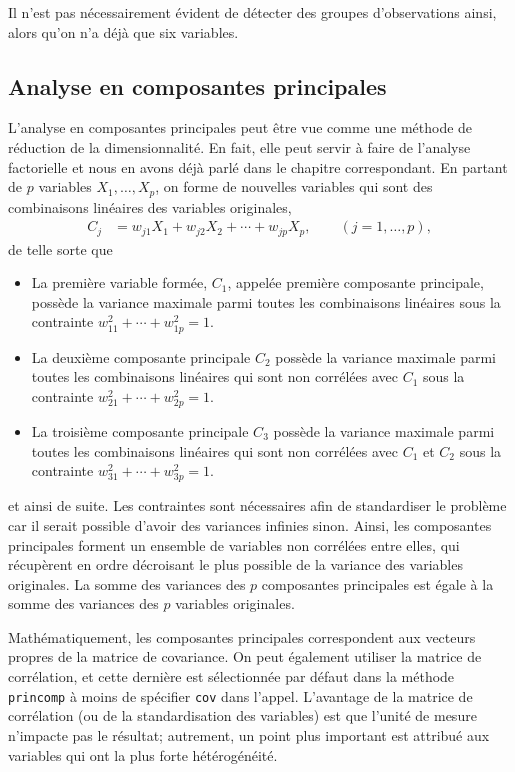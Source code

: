 \documentclass[
  11pt,
  letterpaper,
]{book}
\providecommand{\tightlist}{%
  \setlength{\itemsep}{0pt}\setlength{\parskip}{0pt}}
\theoremstyle{definition}
\theoremstyle{definition}
\theoremstyle{definition}
\theoremstyle{definition}
\theoremstyle{remark}
\begin{document}
Il n'est pas nécessairement évident de détecter des groupes d'observations ainsi, alors qu'on n'a déjà que six variables.

\hypertarget{analyse-en-composantes-principales}{%
\subsection{Analyse en composantes principales}\label{analyse-en-composantes-principales}}

L'analyse en composantes principales peut être vue comme une méthode de réduction de la dimensionnalité. En fait, elle peut servir à faire de l'analyse factorielle et nous en avons déjà parlé dans le chapitre correspondant. En partant de \(p\) variables \(X_1, \ldots, X_p\), on forme de nouvelles variables qui sont des combinaisons linéaires des variables originales,
\begin{align*}
C_j &= w_{j1} X_1 + w_{j2} X_2 + \cdots + w_{jp} X_p, \qquad (j=1, \ldots, p),
\end{align*}
de telle sorte que

\begin{itemize}
\tightlist
\item
  La première variable formée, \(C_1\), appelée première composante principale, possède la variance maximale parmi toutes les combinaisons linéaires sous la contrainte \(w_{11}^2 + \cdots + w_{1p}^2=1\).
\item
  La deuxième composante principale \(C_2\) possède la variance maximale parmi toutes les combinaisons linéaires qui sont non corrélées avec \(C_1\) sous la contrainte \(w_{21}^2 + \cdots + w_{2p}^2=1\).
\item
  La troisième composante principale \(C_3\) possède la variance maximale parmi toutes les combinaisons linéaires qui sont non corrélées avec \(C_1\) et \(C_2\) sous la contrainte \(w_{31}^2 + \cdots + w_{3p}^2=1\).
\end{itemize}

et ainsi de suite. Les contraintes sont nécessaires afin de standardiser le problème car il serait possible d'avoir des variances infinies sinon. Ainsi, les composantes principales forment un ensemble de variables non corrélées entre elles, qui récupèrent en ordre décroisant le plus possible de la variance des variables originales. La somme des variances des \(p\) composantes principales est égale à la somme des variances des \(p\) variables originales.

Mathématiquement, les composantes principales correspondent aux vecteurs propres de la matrice de covariance. On peut également utiliser la matrice de corrélation, et cette dernière est sélectionnée par défaut dans la méthode \texttt{princomp} à moins de spécifier \texttt{cov} dans l'appel. L'avantage de la matrice de corrélation (ou de la standardisation des variables) est que l'unité de mesure n'impacte pas le résultat; autrement, un point plus important est attribué aux variables qui ont la plus forte hétérogénéité.
\end{document}
